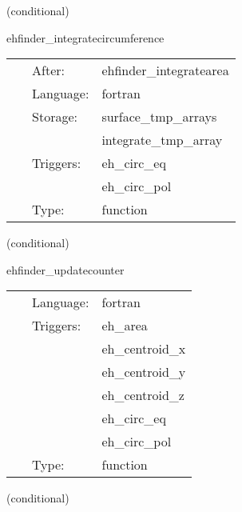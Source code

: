 \vspace{5mm}

   (conditional) 

\hspace{5mm} ehfinder\_integratecircumference 

\hspace{5mm}{\it calculate circumferences } 


\hspace{5mm}

 \begin{tabular*}{160mm}{cll} 
~ & After:  & ehfinder\_integratearea \\ 
~ & Language:  & fortran \\ 
~ & Storage:  & surface\_tmp\_arrays \\ 
~& ~ &integrate\_tmp\_array\\ 
~ & Triggers:  & eh\_circ\_eq \\ 
~& ~ &eh\_circ\_pol\\ 
~ & Type:  & function \\ 
\end{tabular*} 


\vspace{5mm}

   (conditional) 

\hspace{5mm} ehfinder\_updatecounter 

\hspace{5mm}{\it update the loop variables } 


\hspace{5mm}

 \begin{tabular*}{160mm}{cll} 
~ & Language:  & fortran \\ 
~ & Triggers:  & eh\_area \\ 
~& ~ &eh\_centroid\_x\\ 
~& ~ &eh\_centroid\_y\\ 
~& ~ &eh\_centroid\_z\\ 
~& ~ &eh\_circ\_eq\\ 
~& ~ &eh\_circ\_pol\\ 
~ & Type:  & function \\ 
\end{tabular*} 


\vspace{5mm}

   (conditional) 

